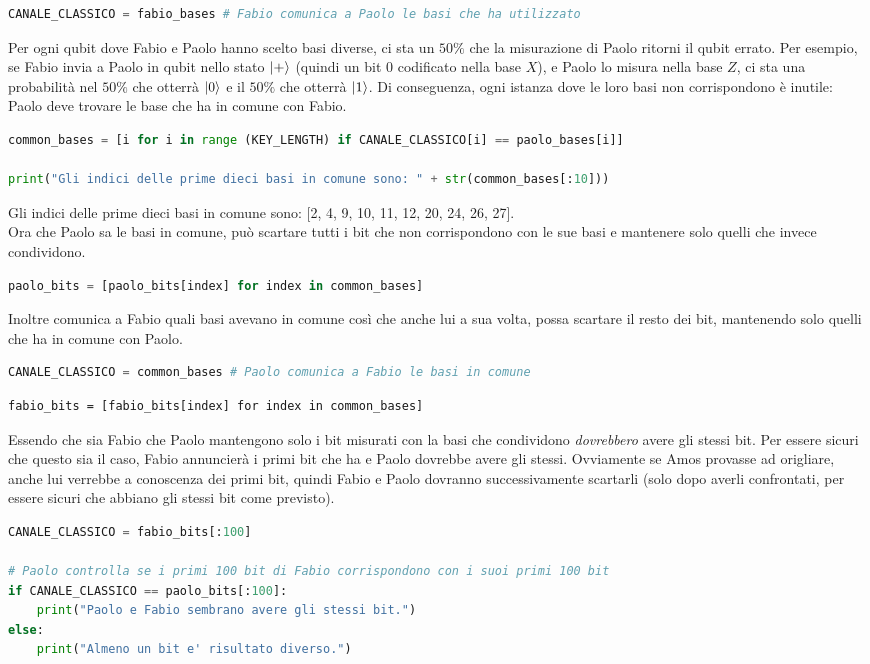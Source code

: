 \documentclass[a4paper]{article}
\begin{document}
\begin{lstlisting}[language=Python]
CANALE_CLASSICO = fabio_bases # Fabio comunica a Paolo le basi che ha utilizzato
\end{lstlisting}
Per ogni qubit dove Fabio e Paolo hanno scelto basi diverse, ci sta un $50\%$ che la
misurazione di Paolo ritorni il qubit errato. 
Per esempio, se Fabio invia a Paolo in qubit nello stato $\ket{+}$ (quindi un bit 
0 codificato nella base $X$), e Paolo lo misura nella base \( Z \), ci sta una probabilità
nel $50\%$ che otterrà $\ket{0}$ e il $50\%$ che otterrà $\ket{1}$.
Di conseguenza, ogni istanza dove le loro basi non corrispondono è inutile: Paolo deve
trovare le base che ha in comune con Fabio.
\begin{lstlisting}[language=Python]
common_bases = [i for i in range (KEY_LENGTH) if CANALE_CLASSICO[i] == paolo_bases[i]]

print("Gli indici delle prime dieci basi in comune sono: " + str(common_bases[:10]))
\end{lstlisting}
Gli indici delle prime dieci basi in comune sono: [2, 4, 9, 10, 11, 12, 20, 24, 26, 27].\\
Ora che Paolo sa le basi in comune, può scartare tutti i bit che non corrispondono con le sue basi
e mantenere solo quelli che invece condividono.
\begin{lstlisting}[language=Python]
paolo_bits = [paolo_bits[index] for index in common_bases]
\end{lstlisting}
Inoltre comunica a Fabio quali basi avevano in comune così che anche lui a sua volta, 
possa scartare il resto dei bit, mantenendo solo quelli che ha in comune con Paolo.
\begin{lstlisting}[language=Python]
CANALE_CLASSICO = common_bases # Paolo comunica a Fabio le basi in comune
\end{lstlisting}
\begin{lstlisting}
fabio_bits = [fabio_bits[index] for index in common_bases]
\end{lstlisting}
Essendo che sia Fabio che Paolo mantengono solo i bit misurati con la basi che condividono
\textit{dovrebbero} avere gli stessi bit. Per essere sicuri che questo sia il caso,
Fabio annuncierà i primi bit che ha e Paolo dovrebbe avere gli stessi. 
Ovviamente se Amos provasse ad origliare, anche lui verrebbe a conoscenza dei primi bit,
quindi Fabio e Paolo dovranno successivamente scartarli (solo dopo averli confrontati,
per essere sicuri che abbiano gli stessi bit come previsto). 
\begin{lstlisting}[language=Python]
CANALE_CLASSICO = fabio_bits[:100] 

# Paolo controlla se i primi 100 bit di Fabio corrispondono con i suoi primi 100 bit
if CANALE_CLASSICO == paolo_bits[:100]:
    print("Paolo e Fabio sembrano avere gli stessi bit.")
else:
    print("Almeno un bit e' risultato diverso.")
\end{lstlisting}
\end{document}
